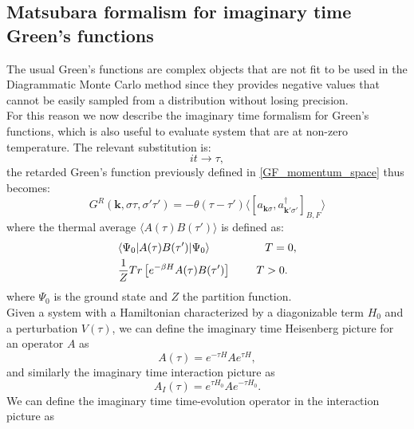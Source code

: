 \documentclass[12pt, a4paper]{report}
\numberwithin{equation}{section}
\begin{document}
\subsection{Matsubara formalism for imaginary time Green's functions}
The usual Green's functions are complex objects that are not fit to be used in the Diagrammatic Monte Carlo method since they provides 
negative values that cannot be easily sampled from a distribution without losing precision.\\
For this reason we now describe the imaginary time formalism for Green's functions, which is also useful to evaluate system that are 
at non-zero temperature. The relevant substitution is:
\begin{equation}
    it\to \tau,
    \label{imaginary_time_substitution}
\end{equation}
the retarded Green's function previously defined in \ref{GF_momentum_space} thus becomes:
\begin{equation}
    G^R(\mathbf{k},\sigma\tau,\sigma'\tau')=-\theta(\tau-\tau')\langle [a_{\mathbf{k}\sigma},a^\dagger_{\mathbf{k}'\sigma'}]_{B,F}\rangle
\end{equation}
where the thermal average $\langle A(\tau)B(\tau')\rangle$ is defined as:
\begin{equation}
\begin{split}
    &\langle \Psi_0|A(\tau)B(\tau')|\Psi_0\rangle\hspace{1.75cm}T=0,\\
    &\frac{1}{Z}Tr\left[e^{-\beta H}A(\tau)B(\tau')\right]\hspace{0.8cm}T>0.
\end{split}
\end{equation}
where $\Psi_0$ is the ground state and $Z$ the partition function.\\
Given a system with a Hamiltonian characterized by a diagonizable term $H_0$ and a perturbation $V(\tau)$, we can define the imaginary time 
Heisenberg picture for an operator $A$ as 
\begin{equation}
    A(\tau)=e^{-\tau H}Ae^{\tau H},
\end{equation}
and similarly the imaginary time interaction picture as
\begin{equation}
    A_I(\tau)=e^{\tau H_0}Ae^{-\tau H_0}.
\end{equation}
We can define the imaginary time time-evolution operator in the interaction picture as 
\end{document}
